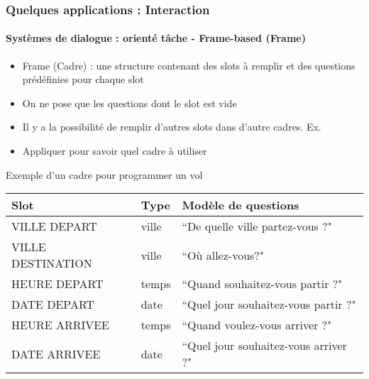 \documentclass[xcolor=table]{beamer}
\begin{document}
\begin{frame}
	\frametitle{Quelques applications : Interaction}
	\framesubtitle{Systèmes de dialogue : orienté tâche - Frame-based (Frame)}
	
	\begin{itemize}
		\item Frame (Cadre) : une structure contenant des slots à remplir et des questions prédéfinies pour chaque slot
		\item On ne pose que les questions dont le slot est vide
		\item Il y a la possibilité de remplir d'autres slots dans d'autre cadres. 
		Ex. 
		\item Appliquer  pour savoir quel cadre à utiliser
	\end{itemize}

	\begin{exampleblock}{Exemple d'un cadre pour programmer un vol \cite{2020-jurafsky-martin}}
		\centering\tiny\bfseries
		\begin{tabular}{lll}
			\hline\hline
			Slot & Type & Modèle de questions \\
			\hline
			VILLE DEPART & ville & ``De quelle ville partez-vous ?" \\
			VILLE DESTINATION & ville & ``Où allez-vous?" \\
			HEURE DEPART & temps & ``Quand souhaitez-vous partir ?" \\
			DATE DEPART & date & ``Quel jour souhaitez-vous partir ?" \\
			HEURE ARRIVEE & temps & ``Quand voulez-vous arriver ?" \\
			DATE ARRIVEE & date & ``Quel jour souhaitez-vous arriver ?" \\
			\hline\hline
		\end{tabular}
	\end{exampleblock}
	
	
\end{frame}
\end{document}

